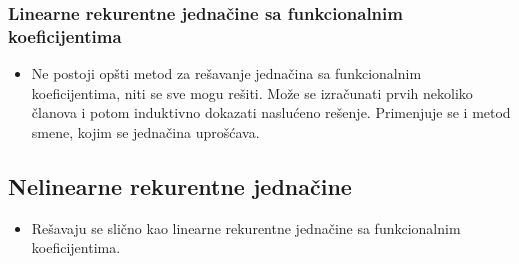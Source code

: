 \documentclass[a4paper,12pt,twoside]{report}
\numberwithin{algorithm}{section}
\begin{document}
\subsubsection{Linearne rekurentne jednačine sa funkcionalnim koeficijentima}
\begin{itemize}
    \item Ne postoji opšti metod za rešavanje jednačina sa funkcionalnim koeficijentima, niti se sve mogu rešiti. Može se izračunati prvih nekoliko članova i potom induktivno dokazati naslućeno rešenje. Primenjuje se i metod smene, kojim se jednačina uprošćava.
\end{itemize}

\subsection{Nelinearne rekurentne jednačine}
\begin{itemize}
    \item Rešavaju se slično kao linearne rekurentne jednačine sa funkcionalnim koeficijentima.
\end{itemize}
\end{document}
